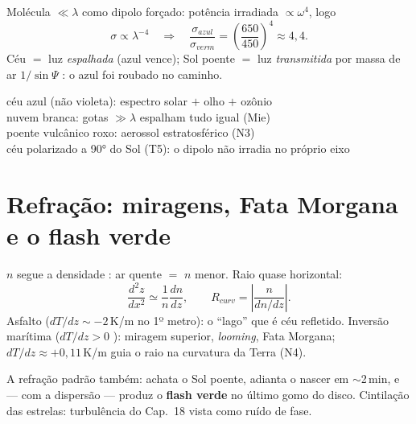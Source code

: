 \documentclass[11pt]{article}
\begin{document}

\begin{formadif}
Molécula $\ll \lambda$ como dipolo forçado: potência irradiada
$\propto \omega^4$, logo
\[ \sigma \propto \lambda^{-4}
\quad\Rightarrow\quad
\frac{\sigma_{azul}}{\sigma_{verm}} =
\left(\frac{650}{450}\right)^4 \approx 4{,}4. \]
Céu $=$ luz \emph{espalhada} (azul vence); Sol poente $=$ luz
\emph{transmitida} por massa de ar $1/\sin\Psi$
: o azul foi roubado no caminho.
\end{formadif}

\begin{noquadro}
céu azul (não violeta): espectro solar $+$ olho $+$ ozônio\\
nuvem branca: gotas $\gg\lambda$ espalham tudo igual (Mie)\\
poente vulcânico roxo: aerossol estratosférico
 (N3)\\
céu polarizado a 90° do Sol (T5): o dipolo não irradia no próprio eixo
\end{noquadro}

\section{Refração: miragens, Fata Morgana e o flash verde}
\label{sec:miragem}


\begin{formadif}
$n$ segue a densidade : ar quente $=$ $n$
menor. Raio quase horizontal:
\[ \frac{d^2z}{dx^2} \simeq \frac{1}{n}\frac{dn}{dz},\qquad
R_{curv} = \left|\frac{n}{dn/dz}\right|. \]
Asfalto ($dT/dz \sim -2$\,K/m no 1º metro): o ``lago'' que é céu
refletido. Inversão marítima ($dT/dz > 0$
): miragem superior, \emph{looming}, Fata
Morgana; $dT/dz \approx +0{,}11$\,K/m guia o raio na curvatura da
Terra (N4).
\end{formadif}

A refração padrão também: achata o Sol poente, adianta o nascer em
$\sim$2\,min, e — com a dispersão — produz o \textbf{flash verde} no
último gomo do disco. Cintilação das estrelas: turbulência do Cap.~18
 vista como ruído de fase.
\end{document}
